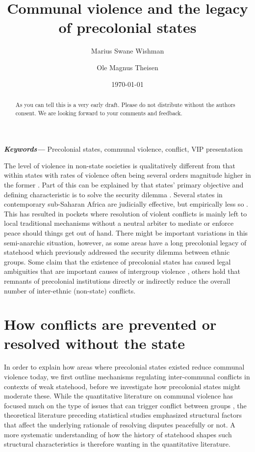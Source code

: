 \documentclass[12pt]{article}
\title{Communal violence and the legacy of precolonial states}
\author[$\dagger$]{Marius Swane Wishman}
\author[$\ddagger$]{Ole Magnus Theisen}
\affil[$\dagger$]{Department of Sociology and Political Science, NTNU}
\affil[$\ddagger$]{Independent PhD researcher}
\date{\today}
\providecommand{\keywords}[1]
{
	\small	
	\textbf{\textit{Keywords---}} #1
}
\begin{document}
\maketitle

\begin{abstract}
	As you can tell this is a very early draft. Please do not distribute
	without the authors consent. We are looking forward to your comments and
	feedback.
\end{abstract}

\bigskip

\keywords{Precolonial states, communal violence, conflict, VIP presentation}

\pagebreak

\onehalfspacing

The level of violence in non-state societies is qualitatively different from
that within states with rates of violence often being several orders magnitude
higher in the former \citep{diamond2013world, LeBlanc2003, Pinker2012}. Part of
this can be explained by that states’ primary objective and defining
characteristic is to solve the security dilemma \citep{Hobbes, Lake_1996}.
Several states in contemporary sub-Saharan Africa are judicially effective, but
empirically less so \citep{Jackson_1982}. This has resulted in pockets where
resolution of violent conflicts is mainly left to local traditional mechanisms
without a neutral arbiter to mediate or enforce peace should things get out of
hand. There might be important variations in this semi-anarchic situation,
however, as some areas have a long precolonial legacy of statehood which
previously addressed the security dilemma between ethnic groups. Some claim that
the existence of precolonial states has caused legal ambiguities that are
important causes of intergroup violence \citep{Eck2014}, others hold that
remnants of precolonial institutions directly \citep{Herbst2014, Wig2018} or
indirectly reduce the overall number of inter-ethnic (non-state) conflicts. 

\section{How conflicts are prevented or resolved without the state}

In order to explain how areas where precolonial states existed reduce communal
violence today, we first outline mechanisms regulating inter-communal conflicts
in contexts of weak statehood, before we investigate how precolonial states
might moderate these. While the quantitative literature on communal violence has
focused much on the type of issues that can trigger conflict between groups
\citep{Doring2020, Eck2014, Elfversson2015, Fjelde2014, Fjelde2012,
Hillesund_2017, Theisen2012}, the theoretical literature preceding statistical
studies emphasized structural factors that affect the underlying rationale of
resolving disputes peacefully or not. A more systematic understanding of how the
history of statehood shapes such structural characteristics is therefore wanting
in the quantitative literature. 
\end{document}
